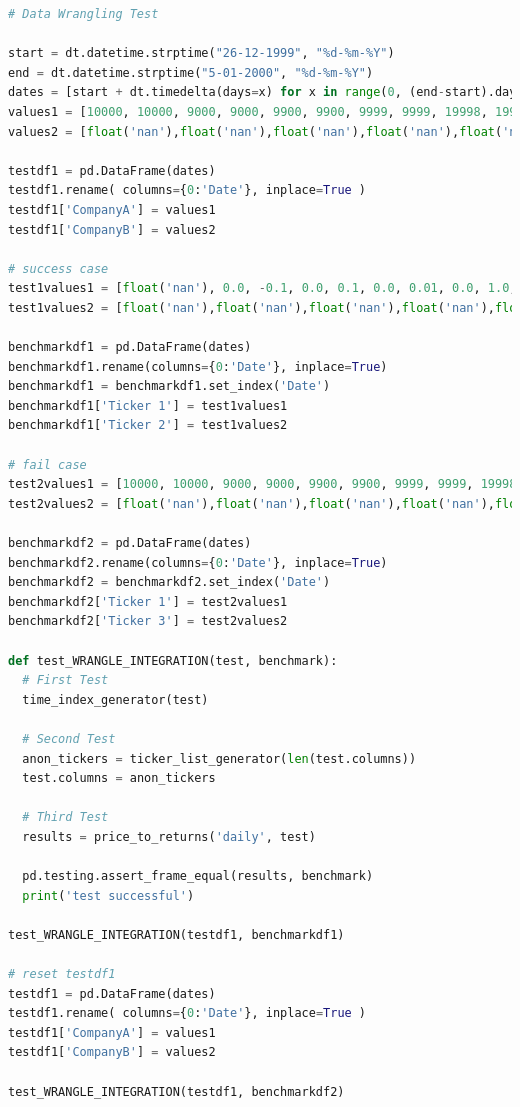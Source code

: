 \documentclass[10pt,onecolumn,letterpaper]{article}
\begin{document}
\begin{lstlisting}[language=Python, breaklines=true, caption={Example of an integration test for 3 linked functionalities.}, label={integration_test}]
# Data Wrangling Test

start = dt.datetime.strptime("26-12-1999", "%d-%m-%Y")
end = dt.datetime.strptime("5-01-2000", "%d-%m-%Y")
dates = [start + dt.timedelta(days=x) for x in range(0, (end-start).days)]
values1 = [10000, 10000, 9000, 9000, 9900, 9900, 9999, 9999, 19998, 19998]
values2 = [float('nan'),float('nan'),float('nan'),float('nan'),float('nan'),float('nan'),float('nan'),float('nan'),float('nan'),float('nan')]

testdf1 = pd.DataFrame(dates)
testdf1.rename( columns={0:'Date'}, inplace=True )
testdf1['CompanyA'] = values1
testdf1['CompanyB'] = values2

# success case
test1values1 = [float('nan'), 0.0, -0.1, 0.0, 0.1, 0.0, 0.01, 0.0, 1.0, 0.0]
test1values2 = [float('nan'),float('nan'),float('nan'),float('nan'),float('nan'),float('nan'),float('nan'),float('nan'),float('nan'),float('nan')]

benchmarkdf1 = pd.DataFrame(dates)
benchmarkdf1.rename(columns={0:'Date'}, inplace=True)
benchmarkdf1 = benchmarkdf1.set_index('Date')
benchmarkdf1['Ticker 1'] = test1values1
benchmarkdf1['Ticker 2'] = test1values2

# fail case
test2values1 = [10000, 10000, 9000, 9000, 9900, 9900, 9999, 9999, 19998, 19998]
test2values2 = [float('nan'),float('nan'),float('nan'),float('nan'),float('nan'),float('nan'),float('nan'),float('nan'),float('nan'),float('nan')]

benchmarkdf2 = pd.DataFrame(dates)
benchmarkdf2.rename(columns={0:'Date'}, inplace=True)
benchmarkdf2 = benchmarkdf2.set_index('Date')
benchmarkdf2['Ticker 1'] = test2values1
benchmarkdf2['Ticker 3'] = test2values2

def test_WRANGLE_INTEGRATION(test, benchmark):
  # First Test
  time_index_generator(test)
  
  # Second Test
  anon_tickers = ticker_list_generator(len(test.columns))
  test.columns = anon_tickers
  
  # Third Test
  results = price_to_returns('daily', test) 
  
  pd.testing.assert_frame_equal(results, benchmark)
  print('test successful')

test_WRANGLE_INTEGRATION(testdf1, benchmarkdf1)

# reset testdf1
testdf1 = pd.DataFrame(dates)
testdf1.rename( columns={0:'Date'}, inplace=True )
testdf1['CompanyA'] = values1
testdf1['CompanyB'] = values2

test_WRANGLE_INTEGRATION(testdf1, benchmarkdf2)
\end{lstlisting} 
\end{document}
